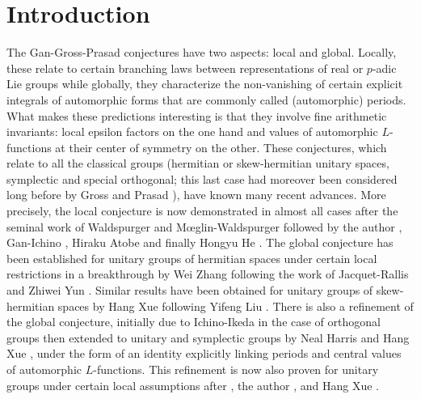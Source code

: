 \section*{Introduction}


The Gan-Gross-Prasad \cite{gan2011symplectic} conjectures have two aspects: local and global.
Locally, these relate to certain branching laws between representations of real or $p$-adic Lie groups while globally, they characterize the non-vanishing of certain explicit integrals of automorphic forms that are commonly called (automorphic) periods.
What makes these predictions interesting is that they involve fine arithmetic invariants: local epsilon factors on the one hand and values of automorphic $L$-functions at their center of symmetry on the other.
These conjectures, which relate to all the classical groups (hermitian or skew-hermitian unitary spaces, symplectic and special orthogonal; this last case had moreover been considered long before by Gross and Prasad \cite{gross1992decomposition,gross1994irreducible}), have known many recent advances.
More precisely, the local conjecture is now demonstrated in almost all cases after the seminal work of Waldspurger \cite{waldspurger2010formule,waldspurger2012calcul,waldspurger2012conjecture,waldspurger2012formule} and Mœglin-Waldspurger \cite{moeglin2012conjecture} followed by the author \cite{beuzart2014expression,beuzart2015endoscopie,beuzart2016conjecture,beuzart2015local}, Gan-Ichino \cite{gan2016gross}, Hiraku Atobe \cite{atobe2018local} and finally Hongyu He \cite{he2017gan}.
The global conjecture has been established for unitary groups of hermitian spaces under certain local restrictions in a breakthrough by Wei Zhang \cite{zhang2014fourier} following the work of Jacquet-Rallis \cite{jacquet2011gross} and Zhiwei Yun \cite{yun2011fundamental}.
Similar results have been obtained for unitary groups of skew-hermitian spaces by Hang Xue \cite{xue2014gan} following Yifeng Liu \cite{liu2014relative}.
There is also a refinement of the global conjecture, initially due to Ichino-Ikeda \cite{ichino2010periods} in the case of orthogonal groups then extended to unitary and symplectic groups by Neal Harris \cite{harris2014refined} and Hang Xue \cite{xue2016fourier,xue2017refined}, under the form of an identity explicitly linking periods and central values of automorphic $L$-functions.
This refinement is now also proven for unitary groups under certain local assumptions after \cite{zhang2014automorphic}, the author \cite{beuzart2021comparison}, and Hang Xue \cite{xue2016fourier,xue2017fourier}.

